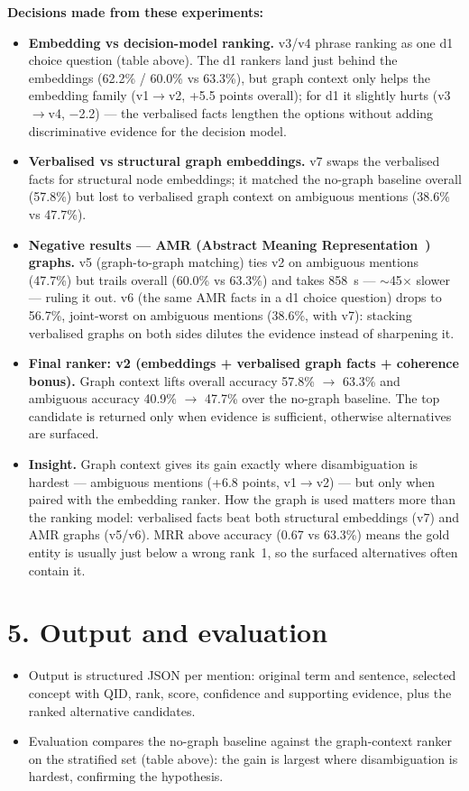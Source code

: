 \documentclass[10pt,a4paper]{article}
\begin{document}
\textbf{Decisions made from these experiments:}
\begin{itemize}
  \item \textbf{Embedding vs decision-model ranking.} v3/v4 phrase ranking as one d1 choice question (table above). The d1 rankers land just behind the embeddings (62.2\% / 60.0\% vs 63.3\%), but graph context only helps the embedding family (v1$\to$v2, +5.5 points overall); for d1 it slightly hurts (v3$\to$v4, $-$2.2) --- the verbalised facts lengthen the options without adding discriminative evidence for the decision model.
  \item \textbf{Verbalised vs structural graph embeddings.} v7 swaps the verbalised facts for structural node embeddings; it matched the no-graph baseline overall (57.8\%) but lost to verbalised graph context on ambiguous mentions (38.6\% vs 47.7\%).
  \item \textbf{Negative results --- AMR (Abstract Meaning Representation~\cite{amr}) graphs.} v5 (graph-to-graph matching) ties v2 on ambiguous mentions (47.7\%) but trails overall (60.0\% vs 63.3\%) and takes 858~s --- $\sim$45$\times$ slower --- ruling it out. v6 (the same AMR facts in a d1 choice question) drops to 56.7\%, joint-worst on ambiguous mentions (38.6\%, with v7): stacking verbalised graphs on both sides dilutes the evidence instead of sharpening it.
  \item \textbf{Final ranker: v2 (embeddings + verbalised graph facts + coherence bonus).} Graph context lifts overall accuracy 57.8\% $\to$ 63.3\% and ambiguous accuracy 40.9\% $\to$ 47.7\% over the no-graph baseline. The top candidate is returned only when evidence is sufficient, otherwise alternatives are surfaced.
  \item \textbf{Insight.} Graph context gives its gain exactly where disambiguation is hardest --- ambiguous mentions (+6.8 points, v1$\to$v2) --- but only when paired with the embedding ranker. How the graph is used matters more than the ranking model: verbalised facts beat both structural embeddings (v7) and AMR graphs (v5/v6). MRR above accuracy (0.67 vs 63.3\%) means the gold entity is usually just below a wrong rank~1, so the surfaced alternatives often contain it.
\end{itemize}

\section*{5. Output and evaluation}
\begin{itemize}
  \item Output is structured JSON per mention: original term and sentence, selected concept with QID, rank, score, confidence and supporting evidence, plus the ranked alternative candidates.
  \item Evaluation compares the no-graph baseline against the graph-context ranker on the stratified set (table above): the gain is largest where disambiguation is hardest, confirming the hypothesis.
\end{itemize}
\end{document}
